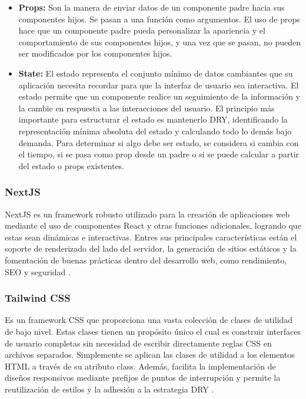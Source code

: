 \begin{itemize}
    \item \textbf{Props:} Son la manera de enviar datos de un componente padre hacia sus componentes hijos. Se pasan a una función como argumentos. El uso de props hace que un componente padre pueda personalizar la apariencia y el comportamiento de sus componentes hijos, y una vez que se pasan, no pueden ser modificados por los componentes hijos. 
    \item \textbf{State:} El estado representa el conjunto mínimo de datos cambiantes que su aplicación necesita recordar para que la interfaz de usuario sea interactiva. El estado permite que un componente realice un seguimiento de la información y la cambie en respuesta a las interacciones del usuario. El principio más importante para estructurar el estado es mantenerlo DRY, identificando la representación mínima absoluta del estado y calculando todo lo demás bajo demanda. Para determinar si algo debe ser estado, se considera si cambia con el tiempo, si se pasa como prop desde un padre o si se puede calcular a partir del estado o props existentes.
\end{itemize}

\subsubsection{NextJS}
NextJS es un framework robusto utilizado para la creación de aplicaciones web mediante el uso de componentes React y otras funciones adicionales, logrando que estas sean dinámicas e interactivas. Entres sus principales características están el soporte de renderizado del lado del servidor, la generación de sitios estáticos y la fomentación de buenas prácticas dentro del desarrollo web, como rendimiento, SEO y seguridad \cite{Vercel}.

\subsubsection{Tailwind CSS}
Es un framework CSS que proporciona una vasta colección de clases de utilidad de bajo nivel. Estas clases tienen un propósito único el cual es construir interfaces de usuario completas sin necesidad de escribir directamente reglas CSS en archivos separados. Simplemente se aplican las clases de utilidad a los elementos HTML a través de su atributo class. Además, facilita la implementación de diseños responsivos mediante prefijos de puntos de interrupción y permite la reutilización de estilos y la adhesión a la estrategia DRY \cite{bhat2023ultimate}.

